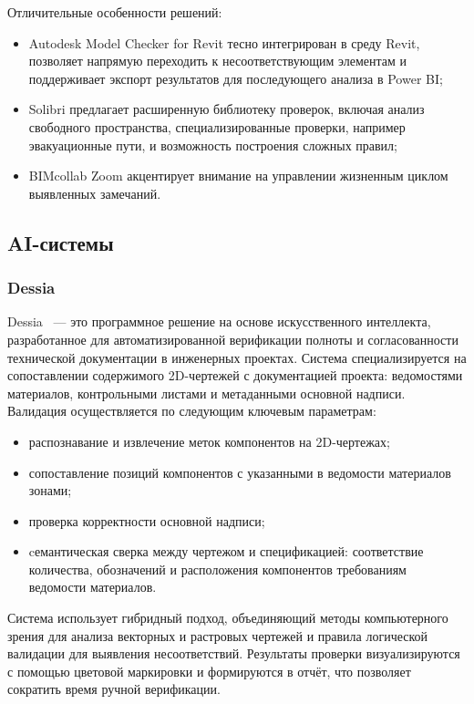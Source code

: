 Отличительные особенности решений:
\begin{itemize}
    \item Autodesk Model Checker for Revit тесно интегрирован в среду Revit, позволяет напрямую переходить к несоответствующим элементам и поддерживает экспорт результатов для последующего анализа в Power BI;
    \item Solibri предлагает расширенную библиотеку проверок, включая анализ свободного пространства, специализированные проверки, например эвакуационные пути, и возможность построения сложных правил;
    \item BIMcollab Zoom акцентирует внимание на управлении жизненным циклом выявленных замечаний.
\end{itemize}

\subsection{AI-системы}
\subsubsection{Dessia}
Dessia~\cite{dessia} --- это программное решение на основе искусственного интеллекта, разработанное для автоматизированной верификации полноты и согласованности технической документации в инженерных проектах. Система специализируется на сопоставлении содержимого 2D-чертежей с документацией проекта: ведомостями материалов, контрольными листами и метаданными основной надписи. Валидация осуществляется по следующим ключевым параметрам:
\begin{itemize}
    \item распознавание и извлечение меток компонентов на 2D-чертежах;
    \item сопоставление позиций компонентов с указанными в ведомости материалов зонами;
    \item проверка корректности основной надписи;
    \item cемантическая сверка между чертежом и спецификацией: соответствие количества, обозначений и расположения компонентов требованиям ведомости материалов.
\end{itemize} 

Система использует гибридный подход, объединяющий методы компьютерного зрения для анализа векторных и растровых чертежей и правила логической валидации для выявления несоответствий. Результаты проверки визуализируются с помощью цветовой маркировки и формируются в отчёт, что позволяет сократить время ручной верификации. 

